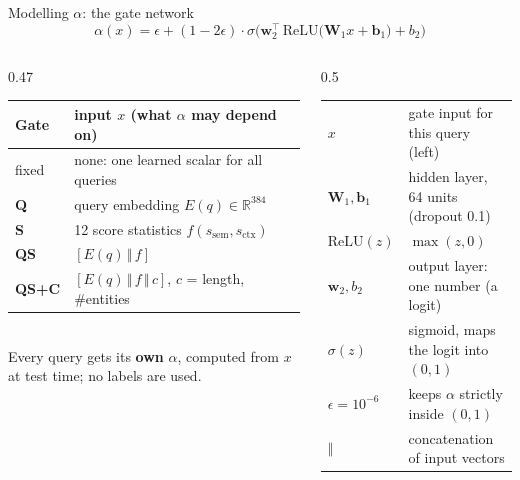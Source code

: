\documentclass[aspectratio=169,11pt]{beamer}
\makeatletter
\newcommand{\gloss}[1]{\begingroup\footnotesize\renewcommand{\arraystretch}{1.18}\begin{tabular}{@{}>{\color{ctx}}l@{\hspace{0.6em}}>{\raggedright\arraybackslash}p{#1}@{}}}
\newcommand{\glossend}{\end{tabular}\endgroup}
\newcommand{\ssem}{s_{\mathrm{sem}}}
\newcommand{\sctx}{s_{\mathrm{ctx}}}
\newcommand{\hl}[1]{{\color{ctx}\bfseries #1}}
\makeatother
\begin{document}
\begin{frame}{Modelling $\alpha$: the gate network}
\[\alpha(x)=\epsilon+(1-2\epsilon)\cdot\sigma\Big(\mathbf w_2^{\!\top}\,\mathrm{ReLU}\big(\mathbf W_1x+\mathbf b_1\big)+b_2\Big)\]
\begin{columns}[T]
\begin{column}{0.47\textwidth}
\renewcommand{\arraystretch}{1.2}
{\small
\begin{tabular}{@{}ll@{}}
\toprule
Gate & input $x$ (what $\alpha$ may depend on)\\
\midrule
fixed & none: one learned scalar for all queries\\
\textbf{Q} & query embedding $E(q)\in\mathbb R^{384}$\\
\textbf{S} & 12 score statistics $f(\ssem,\sctx)$\\
\textbf{QS} & $[E(q)\,\Vert\,f]$\\
\textbf{QS+C} & $[E(q)\,\Vert\,f\,\Vert\,c]$, $c$ = length, \#entities\\
\bottomrule
\end{tabular}}\\[0.3cm]
{\small Every query gets its \hl{own} $\alpha$, computed from $x$ at test time; no labels are used.}
\end{column}
\begin{column}{0.5\textwidth}
\gloss{4.8cm}
$x$ & gate input for this query (left)\\
$\mathbf W_1,\mathbf b_1$ & hidden layer, 64 units (dropout 0.1)\\
$\mathrm{ReLU}(z)$ & $\max(z,0)$\\
$\mathbf w_2,b_2$ & output layer: one number (a logit)\\
$\sigma(z)$ & sigmoid, maps the logit into $(0,1)$\\
$\epsilon=10^{-6}$ & keeps $\alpha$ strictly inside $(0,1)$\\
$\Vert$ & concatenation of input vectors\\
\glossend
\end{column}
\end{columns}
\end{frame}
\end{document}
